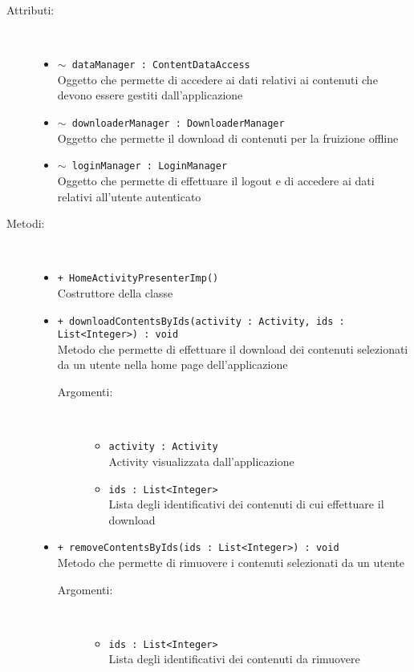 \documentclass[../Tesi.tex]{subfiles}
\begin{document}
		\begin{description}
			\item[Attributi:] \
			\begin{itemize}
				\item \texttt{$\sim$ dataManager : ContentDataAccess}\\
				Oggetto che permette di accedere ai dati relativi ai contenuti che devono essere gestiti dall'applicazione

				\item \texttt{$\sim$ downloaderManager : DownloaderManager}\\
				Oggetto che permette il download di contenuti per la fruizione offline

				\item \texttt{$\sim$ loginManager : LoginManager}\\
				Oggetto che permette di effettuare il logout e di accedere ai dati relativi all'utente autenticato
			\end{itemize}

			\item[Metodi:] \
			\begin{itemize}
				\item \texttt{+ HomeActivityPresenterImp()}\\
				Costruttore della classe 
				
				\item \texttt{+ downloadContentsByIds(activity : Activity, ids : \\List<Integer>) : void}\\
				Metodo che permette di effettuare il download dei contenuti selezionati da un utente nella home page dell'applicazione
				\begin{description}
					\item[Argomenti:] \
					\begin{itemize}
						\item \texttt{activity : Activity}\\
						Activity visualizzata dall'applicazione

						\item \texttt{ids : List<Integer>}\\
						Lista degli identificativi dei contenuti di cui effettuare il download
					\end{itemize}
				\end{description}

				\item \texttt{+ removeContentsByIds(ids : List<Integer>) : void}\\
				Metodo che permette di rimuovere i contenuti selezionati da un utente
				\begin{description}
					\item[Argomenti:] \
					\begin{itemize}
						\item \texttt{ids : List<Integer>}\\
						Lista degli identificativi dei contenuti da rimuovere
					\end{itemize}
				\end{description}


\end{itemize}
\end{description}
\end{document}
